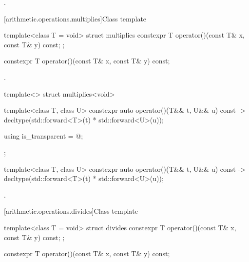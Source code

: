 \begin{itemdescr}
\pnum
\returns
{}.
\end{itemdescr}

[arithmetic.operations.multiplies]{Class template }

%
\begin{itemdecl}
template<class T = void> struct multiplies {
  constexpr T operator()(const T& x, const T& y) const;
};
\end{itemdecl}

%
\begin{itemdecl}
constexpr T operator()(const T& x, const T& y) const;
\end{itemdecl}

\begin{itemdescr}
\pnum
\returns
{}.
\end{itemdescr}

%
\begin{itemdecl}
template<> struct multiplies<void> {
  template<class T, class U> constexpr auto operator()(T&& t, U&& u) const
    -> decltype(std::forward<T>(t) * std::forward<U>(u));

  using is_transparent = @\unspec@;
};
\end{itemdecl}

%
\begin{itemdecl}
template<class T, class U> constexpr auto operator()(T&& t, U&& u) const
    -> decltype(std::forward<T>(t) * std::forward<U>(u));
\end{itemdecl}

\begin{itemdescr}
\pnum
\returns
{}.
\end{itemdescr}

[arithmetic.operations.divides]{Class template }

%
\begin{itemdecl}
template<class T = void> struct divides {
  constexpr T operator()(const T& x, const T& y) const;
};
\end{itemdecl}

%
\begin{itemdecl}
constexpr T operator()(const T& x, const T& y) const;
\end{itemdecl}

